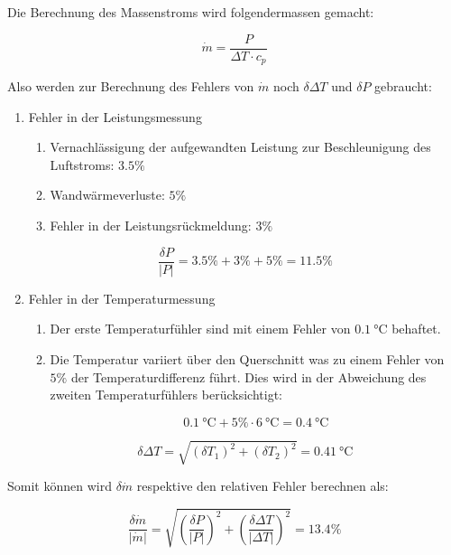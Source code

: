 \documentclass[a4paper,10pt,oneside]{article}
\begin{document}
\vspace{5ex}

Die Berechnung des Massenstroms wird folgendermassen gemacht:

\begin{equation}
\dot{m}=\frac{P}{\Delta T\cdot c_p}
\end{equation}

Also werden zur Berechnung des Fehlers von $\dot{m}$ noch $\delta \Delta T$ und $\delta P$ gebraucht:

\begin{enumerate}

\item Fehler in der Leistungsmessung

\begin{enumerate}
\item Vernachlässigung der aufgewandten Leistung zur Beschleunigung des Luftstroms: $3.5\%$
\item Wandwärmeverluste: $5\%$
\item Fehler in der Leistungsrückmeldung: $3\%$
\end{enumerate}

\[\frac{\delta P}{|P|}=3.5\%+3\%+5\%=11.5\%\]

\item Fehler in der Temperaturmessung
\begin{enumerate}
\item Der erste Temperaturfühler sind mit einem Fehler von $\SI{0.1}{\celsius}$ behaftet.
\item Die Temperatur variiert über den Querschnitt was zu einem Fehler von $5\%$ der Temperaturdifferenz führt. Dies wird in der Abweichung des zweiten Temperaturfühlers berücksichtigt: 

\[\SI{0.1}{\celsius}+5\%\cdot\SI{6}{\celsius}=\SI{0.4}{\celsius}\]
\end{enumerate}

\begin{equation}
\delta \Delta T = \sqrt{(\delta T_1)^2+(\delta T_2)^2} = \SI{0.41}{\celsius}
\end{equation}

\end{enumerate}

Somit können wird $\delta \dot{m}$ respektive den relativen Fehler berechnen als:

\begin{equation}
\frac{\delta\dot{m}}{|\dot{m}|}=\sqrt{\left(\frac{\delta P}{|P|}\right)^2+\left(\frac{\delta \Delta T}{|\Delta T|}\right)^2}=13.4\%
\end{equation}
\end{document}
